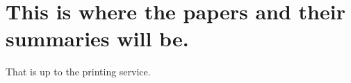 \documentclass[twoside, 10pt]{report}
\begin{document}

\fancyhead{}
\fancyfoot[]{}


\newpage
\thispagestyle{empty}
\mbox{}
\newpage



\newpage
\thispagestyle{empty}
\mbox{}
\newpage




\newpage
\thispagestyle{empty}
\mbox{}
\newpage



\newpage
\thispagestyle{empty}
\mbox{}
\newpage

\tableofcontents

\newpage
\thispagestyle{empty}
\mbox{}
\newpage

\listoftables

\newpage
\thispagestyle{empty}
\mbox{}
\newpage

\listoffigures


\newpage
\thispagestyle{empty}
\mbox{}
\newpage







\newpage
\thispagestyle{empty}
\mbox{}
\newpage




\newpage
\thispagestyle{empty}
\mbox{}
\newpage

\renewcommand{\bibfont}{\fontsize{8}{10}\sffamily}
\renewcommand\bibname{References} %
\printbibliography
{}


\newpage
\thispagestyle{empty}
\mbox{}
\newpage

\fancyhead{}
\fancyfoot[]{}

\chapter*{This is where the papers and their summaries will be.}
That is up to the printing service.
\end{document}
